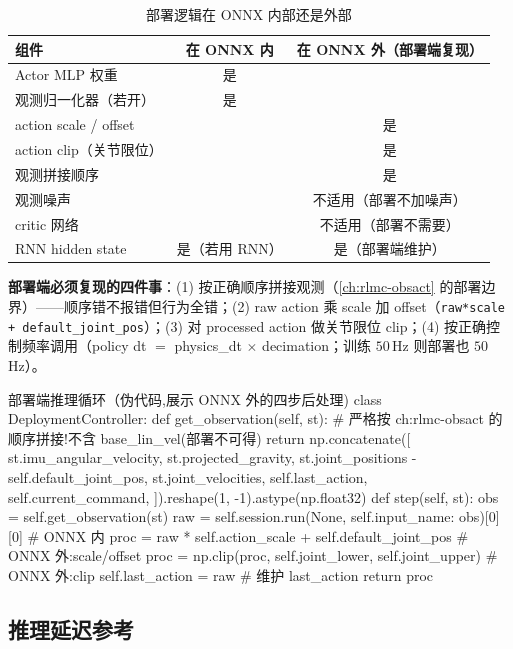 \begin{table}[H]
\centering
\caption{部署逻辑在 ONNX 内部还是外部}
\label{tab:rlmc-onnx-boundary}
\begin{tabular}{lcc}
\hline
组件 & 在 ONNX 内 & 在 ONNX 外（部署端复现） \\
\hline
Actor MLP 权重 & 是 & \\
观测归一化器（若开） & 是 & \\
action scale / offset & & 是 \\
action clip（关节限位） & & 是 \\
观测拼接顺序 & & 是 \\
观测噪声 & & 不适用（部署不加噪声） \\
critic 网络 & & 不适用（部署不需要） \\
RNN hidden state & 是（若用 RNN） & 是（部署端维护） \\
\hline
\end{tabular}
\end{table}

\textbf{部署端必须复现的四件事}：(1) 按正确顺序拼接观测（\cref{ch:rlmc-obsact} 的部署边界）——顺序错不报错但行为全错；(2) raw action 乘 scale 加 offset（\verb|raw*scale + default_joint_pos|）；(3) 对 processed action 做关节限位 clip；(4) 按正确控制频率调用（policy dt $=$ physics\_dt $\times$ decimation；训练 $50\,$Hz 则部署也 $50\,$Hz）。

\begin{codebox}[Python]{部署端推理循环（伪代码,展示 ONNX 外的四步后处理)}
class DeploymentController:
    def get_observation(self, st):
        # 严格按 ch:rlmc-obsact 的顺序拼接!不含 base_lin_vel(部署不可得)
        return np.concatenate([
            st.imu_angular_velocity, st.projected_gravity,
            st.joint_positions - self.default_joint_pos, st.joint_velocities,
            self.last_action, self.current_command,
        ]).reshape(1, -1).astype(np.float32)
    def step(self, st):
        obs = self.get_observation(st)
        raw = self.session.run(None, {self.input_name: obs})[0][0]   # ONNX 内
        proc = raw * self.action_scale + self.default_joint_pos        # ONNX 外:scale/offset
        proc = np.clip(proc, self.joint_lower, self.joint_upper)       # ONNX 外:clip
        self.last_action = raw                                          # 维护 last_action
        return proc
\end{codebox}

\subsection{推理延迟参考}

